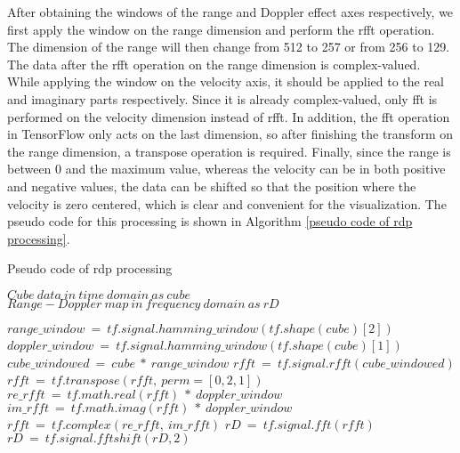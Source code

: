 After obtaining the windows of the range and Doppler effect axes respectively, we first apply the window on the range dimension and perform the \gls{rfft} operation. The dimension of the range will then change from 512 to 257 or from 256 to 129. The data after the \gls{rfft} operation on the range dimension is complex-valued. While applying the window on the velocity axis, it should be applied to the real and imaginary parts respectively. Since it is already complex-valued, only \gls{fft} is performed on the velocity dimension instead of \gls{rfft}. In addition, the \gls{fft} operation in TensorFlow only acts on the last dimension, so after finishing the transform on the range dimension, a transpose operation is required. Finally, since the range is between 0 and the maximum value, whereas the velocity can be in both positive and negative values, the data can be shifted so that the position where the velocity is zero centered, which is clear and convenient for the visualization. The pseudo code for this processing is shown in Algorithm \ref{pseudo code of rdp processing}.

\begin{algorithm}
    \caption{Pseudo code of \gls{rdp} processing}
    \label{pseudo code of rdp processing}
    \renewcommand{\algorithmicrequire}{\textbf{Input:}}
    \renewcommand{\algorithmicensure}{\textbf{Output:}}
    
    \begin{algorithmic}[1]
        \REQUIRE $Cube\ data\ in\ time\ domain\ as\ cube$
        \ENSURE $Range-Doppler\ map\ in\ frequency\ domain\ as\ rD$

        \STATE $range\_window\ =\ tf.signal.hamming\_window(tf.shape(cube)[2])$
        \STATE $doppler\_window\ =\ tf.signal.hamming\_window(tf.shape(cube)[1])$
        \STATE ~
        \STATE $cube\_windowed\ =\ cube\ *\ range\_window$
        \STATE $rfft\ =\ tf.signal.rfft(cube\_windowed)$
        \STATE $rfft\ =\ tf.transpose(rfft,\ perm=[0, 2, 1])$
        \STATE ~
        \STATE $re\_rfft\ =\ tf.math.real(rfft)\ *\ doppler\_window$
        \STATE $im\_rfft\ =\ tf.math.imag(rfft)\ *\ doppler\_window$
        \STATE $rfft\ =\ tf.complex(re\_rfft,\ im\_rfft)$
        \STATE $rD\ =\ tf.signal.fft(rfft)$
        \STATE ~
            \STATE $rD\ =\ tf.signal.fftshift(rD, 2)$
        \ENDIF
        
    \end{algorithmic}
\end{algorithm}

